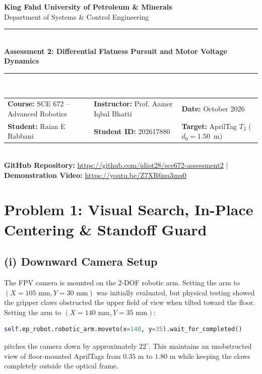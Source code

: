 \documentclass[10pt,a4paper]{article}
\begin{document}
\begin{center}
    {\large \textbf{King Fahd University of Petroleum \& Minerals}}\\[0.04cm]
    {\normalsize Department of Systems \& Control Engineering}\\[0.08cm]
    \rule{\textwidth}{0.6pt}\\[0.08cm]
    {\Large \textbf{Assessment 2: Differential Flatness Pursuit and Motor Voltage Dynamics}}\\[0.08cm]
    \rule{\textwidth}{0.6pt}\\[0.10cm]
    \small
    \begin{tabular*}{\textwidth}{@{\extracolsep{\fill}}lll}
        \textbf{Course:} SCE 672 -- Advanced Robotics & \textbf{Instructor:} Prof. Aamer Iqbal Bhatti & \textbf{Date:} October 2026 \\
        \textbf{Student:} Raian E Rabbani & \textbf{Student ID:} 202617880 & \textbf{Target:} AprilTag $T_3$ ($d_0 = 1.50$~m)
    \end{tabular*}\\[0.08cm]
    \footnotesize
    \textbf{GitHub Repository:} \href{https://github.com/idiot28/sce672-assessment2}{\url{https://github.com/idiot28/sce672-assessment2}} \quad $\boldsymbol{\mid}$ \quad
    \textbf{Demonstration Video:} \href{https://youtu.be/Z7XR6nu3mu0?si=uz1j3nOYoMPpDBvn}{\url{https://youtu.be/Z7XR6nu3mu0}}
\end{center}
\vspace{-0.15cm}

\section*{Problem 1: Visual Search, In-Place Centering \& Standoff Guard}

\subsection*{(i) Downward Camera Setup}
The FPV camera is mounted on the 2-DOF robotic arm. Setting the arm to $(X = 105\text{~mm}, Y = 30\text{~mm})$ was initially evaluated, but physical testing showed the gripper claws obstructed the upper field of view when tilted toward the floor. Setting the arm to $(X = 140\text{~mm}, Y = 35\text{~mm})$:
\begin{lstlisting}[language=Python]
self.ep_robot.robotic_arm.moveto(x=140, y=35).wait_for_completed()
\end{lstlisting}
pitches the camera down by approximately $22^\circ$. This maintains an unobstructed view of floor-mounted AprilTags from $0.35\text{~m}$ to $1.80\text{~m}$ while keeping the claws completely outside the optical frame.
\end{document}
